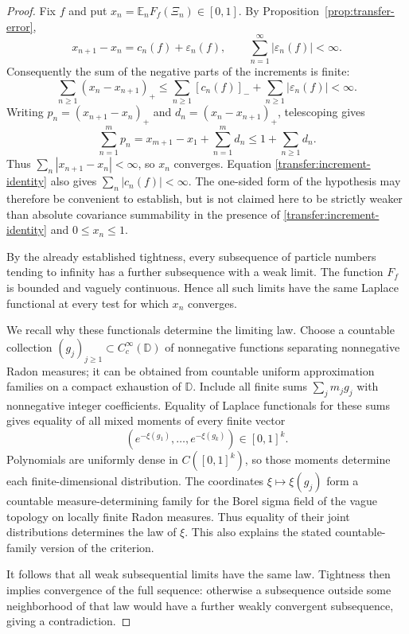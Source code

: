 \documentclass[11pt,a4paper]{article}
\numberwithin{equation}{section}
\theoremstyle{definition}
\theoremstyle{remark}
\newcommand{\D}{\mathbb D}
\newcommand{\E}{\mathbb E}
\begin{document}
\begin{proof}
Fix $f$ and put $x_n=\E_nF_f(\Xi_n)\in[0,1]$. By
Proposition~\ref{prop:transfer-error},
\begin{equation}\label{transfer:increment-identity}
 x_{n+1}-x_n=c_n(f)+\varepsilon_n(f),
 \qquad \sum_{n=1}^{\infty}|\varepsilon_n(f)|<\infty.
\end{equation}
Consequently the sum of the negative parts of the increments is finite:
\[
 \sum_{n\ge1}(x_n-x_{n+1})_+
 \le \sum_{n\ge1}[c_n(f)]_-
      +\sum_{n\ge1}|\varepsilon_n(f)|<\infty.
\]
Writing $p_n=(x_{n+1}-x_n)_+$ and
$d_n=(x_n-x_{n+1})_+$, telescoping gives
\[
 \sum_{n=1}^m p_n
 =x_{m+1}-x_1+\sum_{n=1}^m d_n
 \le1+\sum_{n\ge1}d_n.
\]
Thus $\sum_n|x_{n+1}-x_n|<\infty$, so $x_n$ converges. Equation
\eqref{transfer:increment-identity} also gives
$\sum_n|c_n(f)|<\infty$. The one-sided form of the hypothesis may
therefore be convenient to establish, but is not claimed here to be
strictly weaker than absolute covariance summability in the presence
of \eqref{transfer:increment-identity} and $0\le x_n\le1$.

By the already established tightness, every subsequence of particle
numbers tending to infinity has a further subsequence with a weak
limit. The function $F_f$ is bounded and vaguely continuous. Hence
all such limits have the same Laplace functional at every test for
which $x_n$ converges.

We recall why these functionals determine the limiting law. Choose a
countable collection $(g_j)_{j\ge1}\subset C_c^\infty(\D)$ of
nonnegative functions separating nonnegative Radon measures; it can
be obtained from countable uniform approximation families on a compact
exhaustion of $\D$. Include all finite sums
$\sum_j m_jg_j$ with nonnegative integer coefficients. Equality of
Laplace functionals for these sums gives equality of all mixed moments
of every finite vector
\[
 (e^{-\xi(g_1)},\ldots,e^{-\xi(g_k)})\in[0,1]^k.
\]
Polynomials are uniformly dense in $C([0,1]^k)$, so those moments
determine each finite-dimensional distribution. The coordinates
$\xi\mapsto\xi(g_j)$ form a countable measure-determining family
for the Borel sigma field of the vague topology on locally finite
Radon measures. Thus equality of their joint distributions determines
the law of $\xi$. This also explains the stated countable-family
version of the criterion.

It follows that all weak subsequential limits have the same law.
Tightness then implies convergence of the full sequence: otherwise a
subsequence outside some neighborhood of that law would have a
further weakly convergent subsequence, giving a contradiction.
\end{proof}
\end{document}
